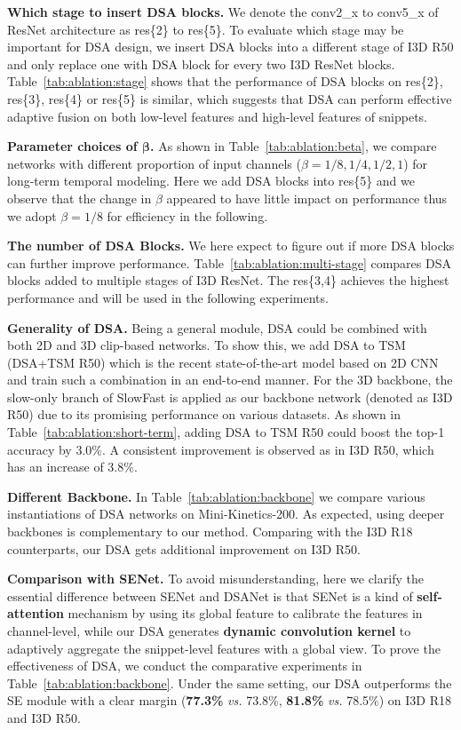 \documentclass[sigconf]{acmart}
\begin{document}
\textbf{Which stage to insert DSA blocks.} 
We denote the conv2\_x to conv5\_x of ResNet architecture as res\{2\} to res\{5\}.
To evaluate which stage may be important for DSA design, we insert DSA blocks into a different stage of I3D R50 and only replace one with DSA block for every two I3D ResNet blocks. Table~\ref{tab:ablation:stage} shows that the performance of DSA blocks on res\{2\}, res\{3\}, res\{4\} or res\{5\} is similar, which suggests that DSA can perform effective adaptive fusion on both low-level features and high-level features of snippets.




\textbf{Parameter choices of $\bm{\beta}$.} 
As shown in Table~\ref{tab:ablation:beta}, we compare networks with different proportion of input channels ($\beta=1/8, 1/4, 1/2, 1$) for long-term temporal modeling. Here we add DSA blocks into res\{5\} and we observe that the change in $\beta$ appeared to have little impact on performance thus we adopt $\beta=1/8$ for efficiency in the following. 

\textbf{The number of DSA Blocks.} 
We here expect to figure out if more DSA blocks can further improve performance. Table~\ref{tab:ablation:multi-stage} compares DSA blocks added to multiple stages of I3D ResNet. The res\{3,4\} achieves the highest performance and will be used in the following experiments.





\textbf{Generality of DSA.} 
Being a general module, DSA could be combined with both 2D and 3D clip-based networks. 
To show this, we add DSA to TSM (DSA+TSM R50) which is the recent state-of-the-art model based on 2D CNN and train such a combination in an end-to-end manner. 
For the 3D backbone, the slow-only branch of SlowFast is applied as our backbone network (denoted as I3D R50) due to its promising performance on various datasets.
As shown in Table~\ref{tab:ablation:short-term}, adding DSA to TSM R50 could boost the top-1 accuracy by 3.0\%. A consistent improvement is observed as in I3D R50, which has an increase of 3.8\%.



\textbf{Different Backbone.}
In Table~\ref{tab:ablation:backbone} we compare various instantiations of DSA networks on Mini-Kinetics-200. 
As expected, using deeper backbones is complementary to our method. Comparing with the I3D R18 counterparts, our DSA gets additional improvement on I3D R50. 

\textbf{Comparison with SENet.}
To avoid misunderstanding, here we clarify the essential difference between SENet and DSANet is that SENet is a kind of \textbf{self-attention} mechanism by using its global feature to calibrate the features in channel-level, while our DSA generates \textbf{dynamic convolution kernel} to adaptively aggregate the snippet-level features with a global view.
To prove the effectiveness of DSA, we conduct the comparative experiments in Table~\ref{tab:ablation:backbone}. Under the same setting, our DSA outperforms the SE module with a clear margin (\textbf{77.3\%} \emph{vs.} 73.8\%, \textbf{81.8\%} \emph{vs.} 78.5\%) on I3D R18 and I3D R50. 
\end{document}
